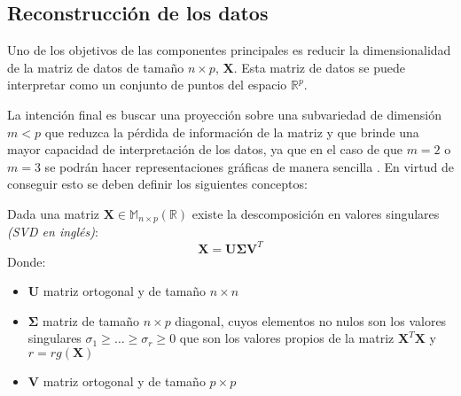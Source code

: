 \subsection{Reconstrucción de los datos}

\noindent Uno de los objetivos de las componentes principales es reducir la dimensionalidad de la matriz de datos de tamaño $n\times p$, \textbf{X}. Esta matriz de datos se puede interpretar como un conjunto de puntos del espacio $\mathbb{R}^p$. 

\noindent La intención final es buscar una proyección sobre una subvariedad de dimensión $m<p$ que reduzca la pérdida de información de la matriz y que brinde una mayor capacidad de interpretación de los datos, ya que en el caso de que $m=2$ o $m=3$ se podrán hacer representaciones gráficas de manera sencilla . En virtud de conseguir esto se deben definir los siguientes conceptos:

\begin{defi}
Dada una matriz $\textbf{X}\in  \mathbb{M}_{n\times p}(\mathbb{R})$ existe la descomposición en valores singulares \textit{(SVD en inglés)}:
\begin{equation}
\textbf{X}=\textbf{U}\mathbf{\Sigma}\textbf{V}^T
\end{equation}
Donde:
\begin{itemize}
\item \textbf{U} matriz ortogonal y de tamaño $n \times n$
\item $\mathbf{\Sigma}$ matriz de tamaño $n \times p $ diagonal, cuyos elementos no nulos son los valores singulares $\sigma_1\geq\ldots\geq \sigma_r\geq 0$ que son los valores propios de la matriz $\textbf{X}^T\textbf{X}$ y $r=rg(\textbf{X})$
\item \textbf{V} matriz ortogonal y de tamaño $p \times p$
\end{itemize}
\end{defi}

